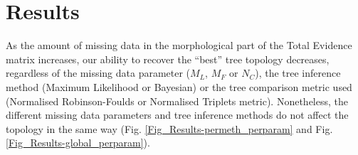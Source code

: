 
%
%

\section{Results}
As the amount of missing data in the morphological part of the Total Evidence matrix increases, our ability to recover the ``best'' tree topology decreases, regardless of the missing data parameter ($M_{L}$, $M_{F}$ or $N_{C}$), the tree inference method (Maximum Likelihood or Bayesian) or the tree comparison metric used (Normalised Robinson-Foulds or Normalised Triplets metric).
Nonetheless, the different missing data parameters and tree inference methods do not affect the topology in the same way (Fig. \ref{Fig_Results-permeth_perparam} and Fig. \ref{Fig_Results-global_perparam}).
 
